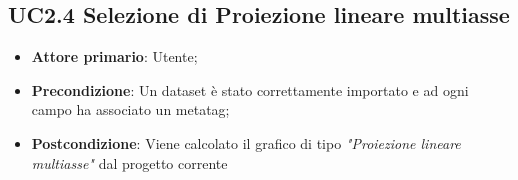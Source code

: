 \subsection{UC2.4 Selezione di Proiezione lineare multiasse}

\begin{itemize}

    \item \textbf{Attore primario}: Utente;

    \item \textbf{Precondizione}:   Un dataset è stato correttamente importato e ad ogni campo ha associato
                                    un metatag;

    \item \textbf{Postcondizione}:  Viene calcolato il grafico di tipo \emph{"Proiezione lineare multiasse"} dal progetto corrente
  
\end{itemize}


